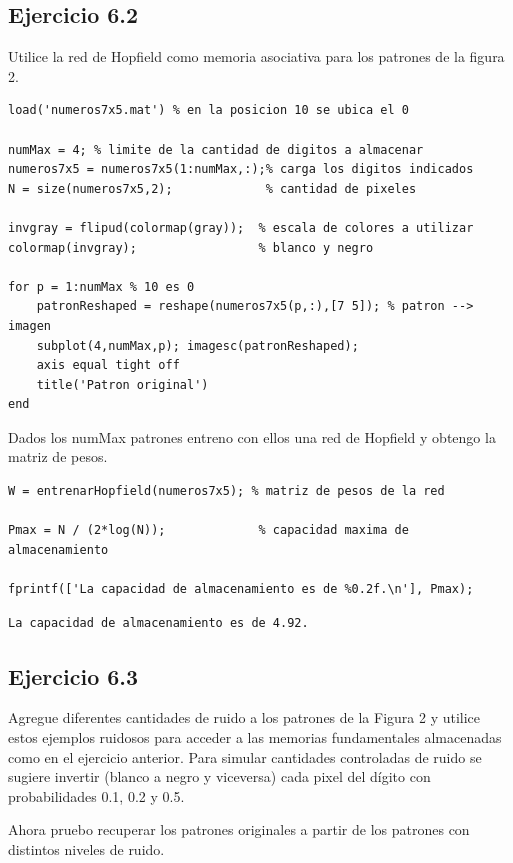 \documentclass[11pt,a4paper,final]{article}
\begin{document}
\subsection{Ejercicio 6.2}

Utilice la red de Hopfield como memoria asociativa para los patrones de la figura 2.

\begin{verbatim}
load('numeros7x5.mat') % en la posicion 10 se ubica el 0

numMax = 4; % limite de la cantidad de digitos a almacenar
numeros7x5 = numeros7x5(1:numMax,:);% carga los digitos indicados
N = size(numeros7x5,2);             % cantidad de pixeles

invgray = flipud(colormap(gray));  % escala de colores a utilizar
colormap(invgray);                 % blanco y negro

for p = 1:numMax % 10 es 0
    patronReshaped = reshape(numeros7x5(p,:),[7 5]); % patron --> imagen
    subplot(4,numMax,p); imagesc(patronReshaped);
    axis equal tight off
    title('Patron original')
end
\end{verbatim}

Dados los numMax patrones entreno con ellos una red de Hopfield y obtengo la matriz de pesos.

\begin{verbatim}
W = entrenarHopfield(numeros7x5); % matriz de pesos de la red

Pmax = N / (2*log(N));             % capacidad maxima de almacenamiento

fprintf(['La capacidad de almacenamiento es de %0.2f.\n'], Pmax);
\end{verbatim}

\begin{verbatim}La capacidad de almacenamiento es de 4.92.
\end{verbatim}
    

\subsection{Ejercicio 6.3}

Agregue diferentes cantidades de ruido a los patrones de la Figura 2 y utilice estos ejemplos ruidosos para acceder a las memorias fundamentales almacenadas como en el ejercicio anterior. Para simular cantidades controladas de ruido se sugiere invertir (blanco a negro y viceversa) cada pixel del dígito con probabilidades 0.1, 0.2 y 0.5.


Ahora pruebo recuperar los patrones originales a partir de los patrones con distintos niveles de ruido.
\end{document}
